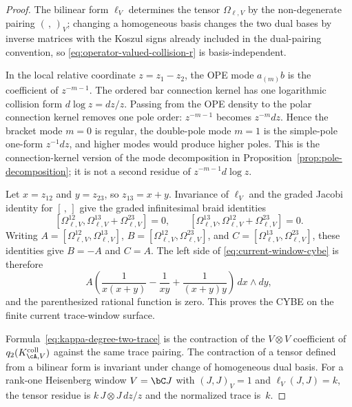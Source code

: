 \begin{proof}
The bilinear form $\ell_V$ determines the tensor
$\Omega_{\ell,V}$ by the non-degenerate pairing $(\,,\,)_V$; changing a
homogeneous basis changes the two dual bases by inverse matrices with
the Koszul signs already included in the dual-pairing convention, so
\eqref{eq:operator-valued-collision-r} is basis-independent.

In the local relative coordinate $z=z_1-z_2$, the OPE mode
$a_{(m)}b$ is the coefficient of $z^{-m-1}$. The ordered bar connection
kernel has one logarithmic collision form $d\log z=dz/z$. Passing from
the OPE density to the polar connection kernel removes one pole order:
$z^{-m-1}$ becomes $z^{-m}dz$. Hence the bracket mode $m=0$ is regular,
the double-pole mode $m=1$ is the simple-pole one-form
$z^{-1}dz$, and higher modes would produce higher poles. This is the
connection-kernel version of the mode decomposition in
Proposition~\ref{prop:pole-decomposition}; it is not a second residue
of $z^{-m-1}d\log z$.

Let $x=z_{12}$ and $y=z_{23}$, so $z_{13}=x+y$. Invariance of
$\ell_V$ and the graded Jacobi identity for $[\, ,\,]$ give the graded
infinitesimal braid identities
\[
[\Omega_{\ell,V}^{12},
 \Omega_{\ell,V}^{13}+\Omega_{\ell,V}^{23}]=0,
\qquad
[\Omega_{\ell,V}^{13},
 \Omega_{\ell,V}^{12}+\Omega_{\ell,V}^{23}]=0 .
\]
Writing
$A=[\Omega_{\ell,V}^{12},\Omega_{\ell,V}^{13}]$,
$B=[\Omega_{\ell,V}^{12},\Omega_{\ell,V}^{23}]$, and
$C=[\Omega_{\ell,V}^{13},\Omega_{\ell,V}^{23}]$, these identities give
$B=-A$ and $C=A$. The left side of
\eqref{eq:current-window-cybe} is therefore
\[
A\left(\frac{1}{x(x+y)}-\frac{1}{xy}
        +\frac{1}{(x+y)y}\right)\,dx\wedge dy,
\]
and the parenthesized rational function is zero. This proves the CYBE
on the finite current trace-window surface.

Formula~\eqref{eq:kappa-degree-two-trace} is the contraction of the
$V\otimes V$ coefficient of $q_2(K^{\mathrm{coll}}_{\cA,V})$ against
the same trace pairing.
The contraction of a tensor defined from a bilinear form is invariant
under change of homogeneous dual basis. For a rank-one Heisenberg
window $V=\bC J$ with $(J,J)_V=1$ and $\ell_V(J,J)=k$, the tensor
residue is $k\,J\otimes J\,dz/z$ and the normalized trace is~$k$.
\end{proof}

